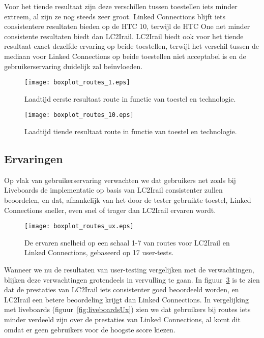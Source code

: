 Voor het tiende resultaat zijn deze verschillen tussen toestellen iets minder extreem, al zijn ze nog steeds zeer groot. Linked Connections blijft iets consistentere resultaten bieden op de HTC 10, terwijl de HTC One net minder consistente resultaten biedt dan LC2Irail. LC2Irail biedt ook voor het tiende resultaat exact dezelfde ervaring op beide toestellen, terwijl het verschil tussen de mediaan voor Linked Connections op beide toestellen niet acceptabel is en de gebruikerservaring duidelijk zal beïnvloeden.

\begin{figure}[h]
	\centering
	\texttt{[image: boxplot\_routes\_1.eps]}
	\caption[Laadtijd eerste resultaat route in functie van toestel en technologie]{Laadtijd eerste resultaat route in functie van toestel en technologie.}
	\label{fig:routesBoxplot1}
\end{figure}

\begin{figure}[h]
	\centering
	\texttt{[image: boxplot\_routes\_10.eps]}
	\caption[Laadtijd tiende resultaat route in functie van toestel en technologie]{Laadtijd tiende resultaat route in functie van toestel en technologie.}
	\label{fig:routesBoxplot10}
\end{figure}

\subsection{Ervaringen}

Op vlak van gebruikerservaring verwachten we dat gebruikers net zoals bij Liveboards de implementatie op basis van LC2Irail consistenter zullen beoordelen, en dat, afhankelijk van het door de tester gebruikte toestel, Linked Connections sneller, even snel of trager dan LC2Irail ervaren wordt.

\begin{figure}[h]
	\centering
	\texttt{[image: boxplot\_routes\_ux.eps]}
	\caption[Ervaren snelheid van routes]{De ervaren snelheid op een schaal 1-7 van routes voor LC2Irail en Linked Connections, gebaseerd op 17 user-tests.}
	\label{fig:routesUx}
\end{figure}

Wanneer we nu de resultaten van user-testing vergelijken met de verwachtingen, blijken deze verwachtingen grotendeels in vervulling te gaan. In figuur~\ref{fig:routesUx} is te zien dat de prestaties van LC2Irail iets consistenter goed beoordeeld worden, en LC2Irail een betere beoordeling krijgt dan Linked Connections. In vergelijking met liveboards (figuur~\ref{fig:liveboardsUx}) zien we dat gebruikers bij routes iets minder verdeeld zijn over de prestaties van Linked Connections, al komt dit omdat er geen gebruikers voor de hoogste score kiezen. 

